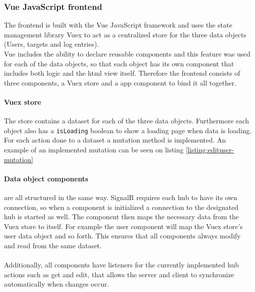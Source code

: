 \documentclass{article}
\begin{document}
\subsubsection{Vue JavaScript frontend}
The frontend is built with the Vue JavaScript framework\cite{url:implementation:vue} and uses the state management library Vuex\cite{url:implementation:vue:vuex} to act as a centralized store for the three data objects (Users, targets and log entries).
\\
Vue includes the ability to declare reusable components and this feature was used for each of the data objects, so that each object has its own component that includes both logic and the \gls{html} view itself. Therefore the frontend consists of three components, a Vuex store and a app component to bind it all together.

\paragraph{Vuex store}
The store contains a dataset for each of the three data objects. Furthermore each object also has a \texttt{isLoading} boolean to show a loading page when data is loading. For each action done to a dataset a mutation method is implemented. An example of an implemented mutation can be seen on listing \ref{listing:edituser-mutation}


\paragraph{Data object components} are all structured in the same way. SignalR requires each hub to have its own connection, so when a component is initialized a connection to the designated hub is started as well. The component then maps the necessary data from the Vuex store to itself. For example the user component will map the Vuex store's user data object and so forth. This ensures that all components always modify and read from the same dataset.
\\\\
Additionally, all components have listeners for the currently implemented hub actions such as get and edit, that allows the server and client to synchronize automatically when changes occur.
\end{document}
